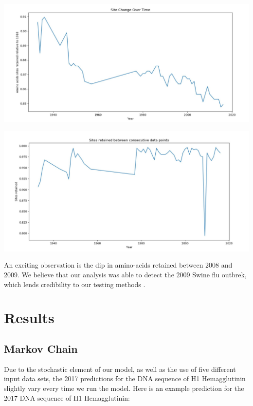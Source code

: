\documentclass[12pt]{article}
\newenvironment{Figure}
  {\par\medskip\noindent\minipage{\linewidth}}
  {\endminipage\par\medskip}
\begin{document}
\begin{multicols}{2}
\begin{Figure}
 \centering
 \includegraphics[width=\linewidth]{changeRelative1918.jpg}
\end{Figure}

\begin{Figure}
 \centering
 \includegraphics[width=\linewidth]{sitesretained.JPG}
\end{Figure}

An exciting observation is the dip in amino-acids retained between 2008 and 2009. We believe that our analysis was able to detect the 2009 Swine flu outbrek, which lends credibility to our testing methods \citep{coburn2009modeling}.

\section{Results}
\subsection{Markov Chain}
Due to the stochastic element of our model, as well as the use of five different input data sets, the 2017 predictions for the DNA sequence of H1 Hemagglutinin slightly vary every time we run the model. Here is an example prediction for the 2017 DNA sequence of H1 Hemagglutinin:


\end{multicols}
\end{document}
